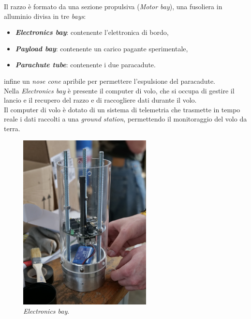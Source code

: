 \documentclass[12pt,a4paper,twoside]{book}
\begin{document}
Il razzo è formato da una sezione propulsiva (\emph{Motor bay}), una fusoliera
in alluminio divisa in tre \emph{bays}:
\begin{itemize}
    \item \textbf{\emph{Electronics bay}}: contenente l'elettronica di bordo,
    \item \textbf{\emph{Payload bay}}: contenente un carico pagante sperimentale,
    \item \textbf{\emph{Parachute tube}}: contenente i due paracadute.
\end{itemize}
infine un \emph{nose cone} apribile per permettere l'espulsione del paracadute. \\

Nella \emph{Electronics bay}
è presente il computer di volo, che si occupa di
gestire il lancio e il recupero del razzo e di raccogliere dati durante il volo. \\
Il computer di volo è dotato di un sistema di telemetria che trasmette in tempo
reale i dati raccolti a una \emph{ground station}, permettendo il monitoraggio
del volo da terra.

\begin{figure}[H]
    \centering
    \includegraphics[width=0.6\textwidth]{img/electronics-bay.jpg}
    \caption{\emph{Electronics bay}.}
    \label{fig:electronics-bay}
\end{figure}
\end{document}
